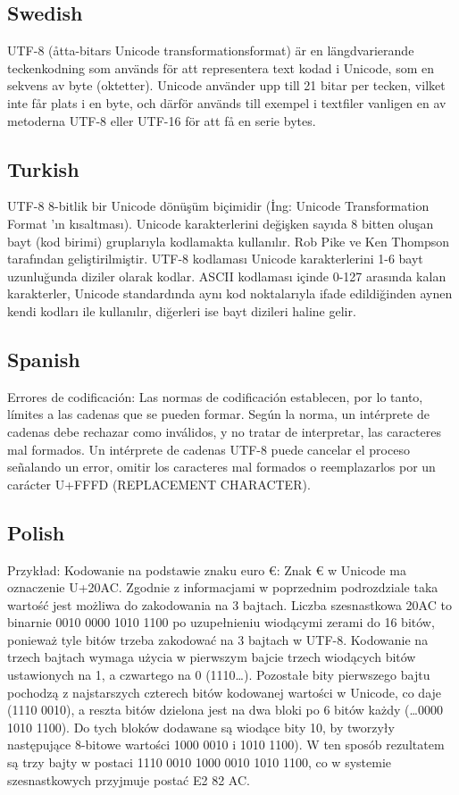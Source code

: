 \subsection{Swedish}
UTF-8 (åtta-bitars Unicode transformationsformat) är en längdvarierande teckenkodning som används för att representera text kodad i Unicode, som en sekvens av byte (oktetter). Unicode använder upp till 21 bitar per tecken, vilket inte får plats i en byte, och därför används till exempel i textfiler vanligen en av metoderna UTF-8 eller UTF-16 för att få en serie bytes.

\subsection{Turkish}
UTF-8 8-bitlik bir Unicode dönüşüm biçimidir (İng: Unicode Transformation Format 'ın kısaltması). Unicode karakterlerini değişken sayıda 8 bitten oluşan bayt (kod birimi) gruplarıyla kodlamakta kullanılır. Rob Pike ve Ken Thompson tarafından geliştirilmiştir. UTF-8 kodlaması Unicode karakterlerini 1-6 bayt uzunluğunda diziler olarak kodlar. ASCII kodlaması içinde 0-127 arasında kalan karakterler, Unicode standardında aynı kod noktalarıyla ifade edildiğinden aynen kendi kodları ile kullanılır, diğerleri ise bayt dizileri haline gelir.

\subsection{Spanish}
Errores de codificación: Las normas de codificación establecen, por lo tanto, límites a las cadenas que se pueden formar. Según la norma, un intérprete de cadenas debe rechazar como inválidos, y no tratar de interpretar, las caracteres mal formados. Un intérprete de cadenas UTF-8 puede cancelar el proceso señalando un error, omitir los caracteres mal formados o reemplazarlos por un carácter U+FFFD (REPLACEMENT CHARACTER).

\subsection{Polish}
Przykład: Kodowanie na podstawie znaku euro €: Znak € w Unicode ma oznaczenie U+20AC. Zgodnie z informacjami w poprzednim podrozdziale taka wartość jest możliwa do zakodowania na 3 bajtach. Liczba szesnastkowa 20AC to binarnie 0010 0000 1010 1100 po uzupełnieniu wiodącymi zerami do 16 bitów, ponieważ tyle bitów trzeba zakodować na 3 bajtach w UTF-8.    Kodowanie na trzech bajtach wymaga użycia w pierwszym bajcie trzech wiodących bitów ustawionych na 1, a czwartego na 0 (1110…). Pozostałe bity pierwszego bajtu pochodzą z najstarszych czterech bitów kodowanej wartości w Unicode, co daje (1110 0010), a reszta bitów dzielona jest na dwa bloki po 6 bitów każdy (…0000 1010 1100). Do tych bloków dodawane są wiodące bity 10, by tworzyły następujące 8-bitowe wartości 1000 0010 i 1010 1100). W ten sposób rezultatem są trzy bajty w postaci 1110 0010 1000 0010 1010 1100, co w systemie szesnastkowych przyjmuje postać E2 82 AC.


